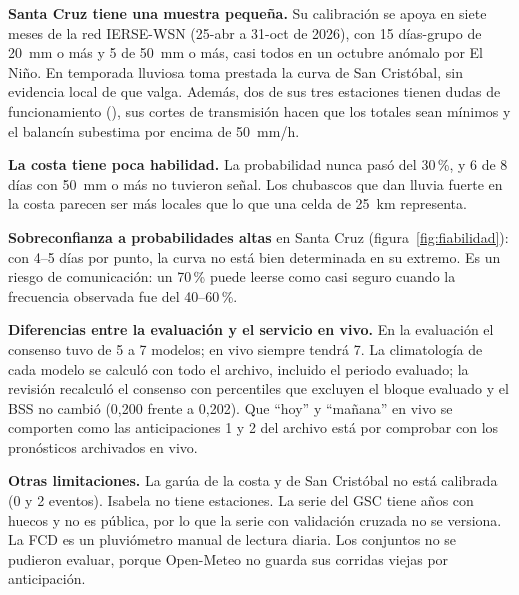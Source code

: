 \documentclass{sosg-informe}
\begin{document}
\textbf{Santa Cruz tiene una muestra pequeña.} Su calibración se apoya en siete meses de la red IERSE-WSN (25-abr a 31-oct de 2026), con 15 días-grupo de 20~mm o más y 5 de 50~mm o más, casi todos en un octubre anómalo por El Niño. En temporada lluviosa toma prestada la curva de San Cristóbal, sin evidencia local de que valga. Además, dos de sus tres estaciones tienen dudas de funcionamiento (), sus cortes de transmisión hacen que los totales sean mínimos y el balancín subestima por encima de 50~mm/h.

\textbf{La costa tiene poca habilidad.} La probabilidad nunca pasó del 30\,\%, y 6 de 8 días con 50~mm o más no tuvieron señal. Los chubascos que dan lluvia fuerte en la costa parecen ser más locales que lo que una celda de 25~km representa.

\textbf{Sobreconfianza a probabilidades altas} en Santa Cruz (figura~\ref{fig:fiabilidad}): con 4--5 días por punto, la curva no está bien determinada en su extremo. Es un riesgo de comunicación: un 70\,\% puede leerse como casi seguro cuando la frecuencia observada fue del 40--60\,\%.

\textbf{Diferencias entre la evaluación y el servicio en vivo.} En la evaluación el consenso tuvo de 5 a 7 modelos; en vivo siempre tendrá 7. La climatología de cada modelo se calculó con todo el archivo, incluido el periodo evaluado; la revisión recalculó el consenso con percentiles que excluyen el bloque evaluado y el BSS no cambió (0,200 frente a 0,202). Que \enquote{hoy} y \enquote{mañana} en vivo se comporten como las anticipaciones 1 y 2 del archivo está por comprobar con los pronósticos archivados en vivo.

\textbf{Otras limitaciones.} La garúa de la costa y de San Cristóbal no está calibrada (0 y 2 eventos). Isabela no tiene estaciones. La serie del GSC tiene años con huecos y no es pública, por lo que la serie con validación cruzada no se versiona. La FCD es un pluviómetro manual de lectura diaria. Los conjuntos no se pudieron evaluar, porque Open-Meteo no guarda sus corridas viejas por anticipación.

\end{document}
